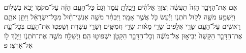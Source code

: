 \documentclass{openreader}
\begin{document}
אִ֣ם אֶת־הַדָּבָ֤ר הַזֶּה֙ תַּעֲשֶׂ֔ה וְצִוְּךָ֣ אֱלֹהִ֔ים וְיָֽכָלְתָּ֖ עֲמֹ֑ד וְגַם֙ כָּל־הָעָ֣ם הַזֶּ֔ה עַל־מְקֹמֹ֖ו יָבֹ֥א בְשָׁלֹֽום׃ 
וַיִּשְׁמַ֥ע מֹשֶׁ֖ה לְקֹ֣ול חֹתְנֹ֑ו וַיַּ֕עַשׂ כֹּ֖ל אֲשֶׁ֥ר אָמָֽר׃ 
וַיִּבְחַ֨ר מֹשֶׁ֤ה אַנְשֵׁי־חַ֨יִל֙ מִכָּל־יִשְׂרָאֵ֔ל וַיִּתֵּ֥ן אֹתָ֛ם רָאשִׁ֖ים עַל־הָעָ֑ם שָׂרֵ֤י אֲלָפִים֙ שָׂרֵ֣י מֵאֹ֔ות שָׂרֵ֥י חֲמִשִּׁ֖ים וְשָׂרֵ֥י עֲשָׂרֹֽת׃ 
וְשָׁפְט֥וּ אֶת־הָעָ֖ם בְּכָל־עֵ֑ת אֶת־הַדָּבָ֤ר הַקָּשֶׁה֙ יְבִיא֣וּן אֶל־מֹשֶׁ֔ה וְכָל־הַדָּבָ֥ר הַקָּטֹ֖ן יִשְׁפּוּט֥וּ הֵֽם׃ 
וַיְשַׁלַּ֥ח מֹשֶׁ֖ה אֶת־חֹתְנֹ֑ו וַיֵּ֥לֶךְ לֹ֖ו אֶל־אַרְצֹֽו׃ פ 
\end{document}
